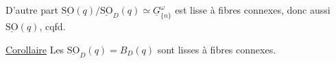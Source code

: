 D'autre part $\underline{\mathrm{SO}}(q)/\underline{\mathrm{SO}}_D(q)\simeq\underline G_{\{n\}}^\omega$ est lisse à fibres connexes, donc aussi $\underline{\mathrm{SO}}(q)$, cqfd.

\uline{Corollaire} Les $\underline{\mathrm{SO}}_D(q)=B_D(q)$ sont lisses à fibres connexes.
